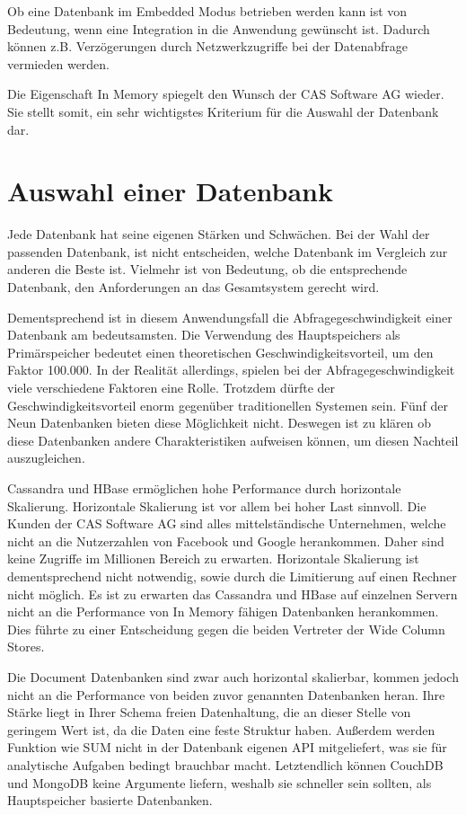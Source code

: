Ob eine Datenbank im Embedded Modus betrieben werden kann ist von Bedeutung, wenn eine Integration in die Anwendung gewünscht ist. Dadurch können z.B. Verzögerungen durch Netzwerkzugriffe bei der Datenabfrage vermieden werden. 

Die Eigenschaft In Memory spiegelt den Wunsch der CAS Software AG wieder. Sie stellt somit, ein sehr wichtigstes Kriterium für die Auswahl der Datenbank dar.

\section{Auswahl einer Datenbank}
\label{ch:AnalyseDatenbanken:sec:Ergebniss}

Jede Datenbank hat seine eigenen Stärken und Schwächen. Bei der Wahl der passenden Datenbank, ist nicht entscheiden, welche Datenbank im Vergleich zur anderen die Beste ist. Vielmehr ist von Bedeutung, ob die entsprechende Datenbank, den Anforderungen an das Gesamtsystem gerecht wird. 

Dementsprechend ist in diesem Anwendungsfall die Abfragegeschwindigkeit einer Datenbank am bedeutsamsten. Die Verwendung des Hauptspeichers als Primärspeicher bedeutet einen theoretischen Geschwindigkeitsvorteil, um den Faktor 100.000.
In der Realität allerdings, spielen bei der Abfragegeschwindigkeit viele verschiedene Faktoren eine Rolle. Trotzdem dürfte der Geschwindigkeitsvorteil enorm gegenüber traditionellen Systemen sein. Fünf der Neun Datenbanken bieten diese Möglichkeit nicht. Deswegen ist zu klären ob diese Datenbanken andere Charakteristiken aufweisen können, um diesen Nachteil auszugleichen.

Cassandra und HBase ermöglichen hohe Performance durch horizontale Skalierung. Horizontale Skalierung ist vor allem bei hoher Last sinnvoll. Die Kunden der CAS Software AG sind alles mittelständische Unternehmen, welche nicht an die Nutzerzahlen von Facebook und Google herankommen. Daher sind keine Zugriffe im Millionen Bereich zu erwarten. Horizontale Skalierung ist dementsprechend nicht notwendig, sowie durch die Limitierung auf einen Rechner nicht möglich. Es ist zu erwarten das Cassandra und HBase auf einzelnen Servern nicht an die Performance von In Memory fähigen Datenbanken herankommen. Dies führte zu einer Entscheidung gegen die beiden Vertreter der Wide Column Stores.

Die Document Datenbanken sind zwar auch horizontal skalierbar, kommen jedoch nicht an die Performance von beiden zuvor genannten Datenbanken heran. Ihre Stärke liegt in Ihrer Schema freien Datenhaltung, die an dieser Stelle von geringem Wert ist, da die Daten eine feste Struktur haben. Außerdem werden Funktion wie SUM nicht in der Datenbank eigenen API mitgeliefert, was sie für analytische Aufgaben bedingt brauchbar macht. Letztendlich können CouchDB und MongoDB keine Argumente liefern, weshalb sie schneller sein sollten, als Hauptspeicher basierte Datenbanken.

